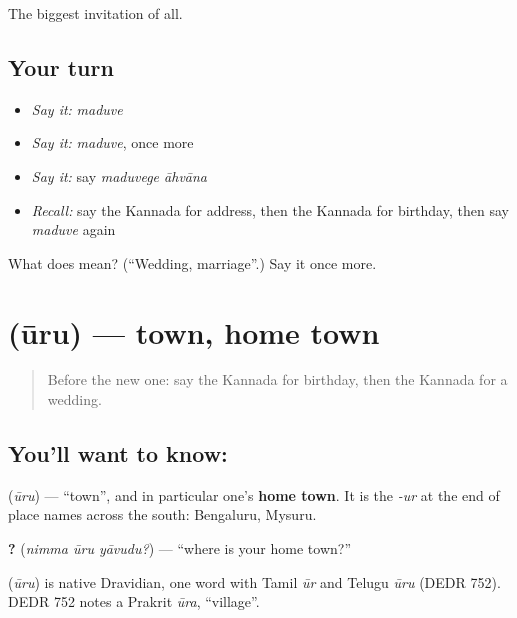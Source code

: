 \begin{grammarlens}[title={What you've built}]
The biggest invitation of all.
\end{grammarlens}

\subsection*{Your turn}
\begin{itemize}
\raggedright
  \item \emph{Say it:} \emph{maduve}
  \item \emph{Say it:} \emph{maduve}, once more
  \item \emph{Say it:} say \emph{maduvege āhvāna}
  \item \emph{Recall:} say the Kannada for address, then the Kannada for birthday, then say \emph{maduve} again
\end{itemize}

\begin{tcolorbox}[breakable,colback=teal!4,colframe=teal!35!black,title={Before you move on}]
What does  mean? (\textquotedblleft{}Wedding, marriage\textquotedblright{}.) Say it once more.
\end{tcolorbox}
\section[\texorpdfstring{\kn{ಊರು} (ūru)}{ಊರು (ūru)}]{ (ūru) — town, home town}

\label{lesson:KA-C91-hometown}



\begin{quote}
Before the new one: say the Kannada for birthday, then the Kannada for a wedding.
\end{quote}

\subsection*{You'll want to know: }
\textbf{} (\emph{ūru}) — \textquotedblleft{}town\textquotedblright{}, and in particular one's \textbf{home town}. It is the \emph{-ur} at the end of place names across the south: Bengaluru, Mysuru.

\textbf{  ?} (\emph{nimma ūru yāvudu?}) — \textquotedblleft{}where is your home town?\textquotedblright{}

\begin{cousinweb}
\textbf{} (\emph{ūru}) is native Dravidian, one word with Tamil \emph{ūr} and Telugu \emph{ūru} (DEDR 752). DEDR 752 notes a Prakrit \emph{ūra}, \textquotedblleft{}village\textquotedblright{}.
\end{cousinweb}


